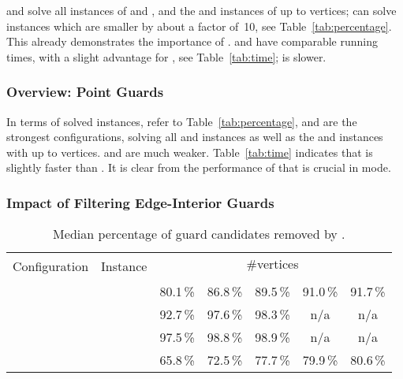 \vdefault and \vnodom solve all instances of \walk and \concavevalleys, and the \sinewalk and \parabolawalk instances of up to  vertices;
\vnow can solve instances which are smaller by about a factor of~10, see Table~\ref{tab:percentage}.
This already demonstrates the importance of \witnessfilter.
\vdefault and \vnodom have comparable running times, with a slight advantage for \vdefault, see Table~\ref{tab:time}; \vnow is slower.

\subsubsection{Overview: Point Guards}
\label{sec:experiments-point}

In terms of solved instances, refer to Table~\ref{tab:percentage}, \pdefault and \pnodom are the strongest configurations, solving all \walk and \concavevalleys instances as well as the \sinewalk and \parabolawalk instances with up to  vertices.
\pnow and \pnoedge are much weaker.
Table~\ref{tab:time} indicates that \pdefault is slightly faster than \pnodom.
It is clear from the performance of \pnoedge that \pointguardfilter is crucial in \pointguardmode mode.

\subsubsection{Impact of Filtering Edge-Interior Guards}
\label{sec:experiments-edge}

\begin{table}
	\centering
	\small
	\begin{tabular}{|l|l|ccccc|}
		\hline
		\multirow{2}{*}{Configuration} & \multirow{2}{*}{Instance} & \multicolumn{5}{|c|}{\#vertices} \\
		& &  &  &  &  &  \\
		\hline
		\hline
		\multirow{4}{*}{\pnodom}
			& \walk           & 80.1\,\% & 86.8\,\% & 89.5\,\% & 91.0\,\% & 91.7\,\% \\
			& \sinewalk       & 92.7\,\% & 97.6\,\% & 98.3\,\% &      n/a &      n/a \\
			& \parabolawalk   & 97.5\,\% & 98.8\,\% & 98.9\,\% &      n/a &      n/a \\
			& \concavevalleys & 65.8\,\% & 72.5\,\% & 77.7\,\% & 79.9\,\% & 80.6\,\% \\
		\hline
	\end{tabular}
	\caption{Median percentage of guard candidates removed by \pointguardfilter.}
	\label{tab:pointguardfilter}
\end{table}

